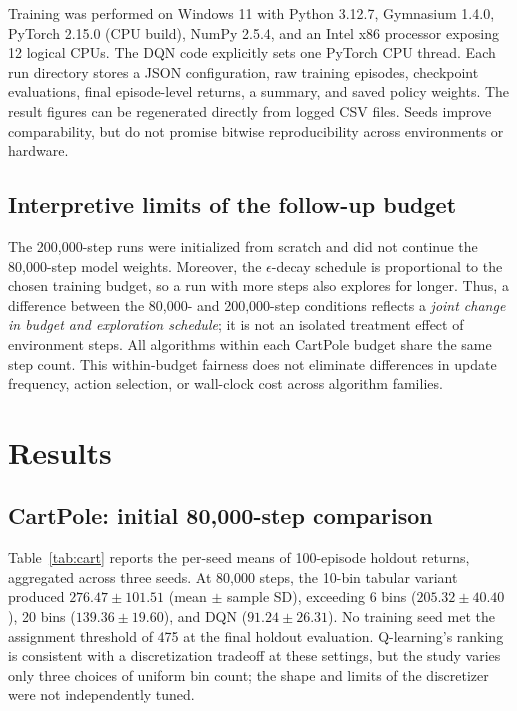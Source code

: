 \documentclass[conference,10pt]{IEEEtran}
\begin{document}
Training was performed on Windows 11 with Python 3.12.7, Gymnasium 1.4.0, PyTorch 2.15.0 (CPU build), NumPy 2.5.4, and an Intel x86 processor exposing 12 logical CPUs. The DQN code explicitly sets one PyTorch CPU thread. Each run directory stores a JSON configuration, raw training episodes, checkpoint evaluations, final episode-level returns, a summary, and saved policy weights. The result figures can be regenerated directly from logged CSV files. Seeds improve comparability, but do not promise bitwise reproducibility across environments or hardware.

\subsection{Interpretive limits of the follow-up budget}
The 200,000-step runs were initialized from scratch and did not continue the 80,000-step model weights. Moreover, the $\epsilon$-decay schedule is proportional to the chosen training budget, so a run with more steps also explores for longer. Thus, a difference between the 80,000- and 200,000-step conditions reflects a \emph{joint change in budget and exploration schedule}; it is not an isolated treatment effect of environment steps. All algorithms within each CartPole budget share the same step count. This within-budget fairness does not eliminate differences in update frequency, action selection, or wall-clock cost across algorithm families.

\section{Results}
\subsection{CartPole: initial 80,000-step comparison}
Table~\ref{tab:cart} reports the per-seed means of 100-episode holdout returns, aggregated across three seeds. At 80,000 steps, the 10-bin tabular variant produced $276.47\pm101.51$ (mean $\pm$ sample SD), exceeding 6 bins ($205.32\pm40.40$), 20 bins ($139.36\pm19.60$), and DQN ($91.24\pm26.31$). No training seed met the assignment threshold of 475 at the final holdout evaluation. Q-learning's ranking is consistent with a discretization tradeoff at these settings, but the study varies only three choices of uniform bin count; the shape and limits of the discretizer were not independently tuned.
\end{document}
